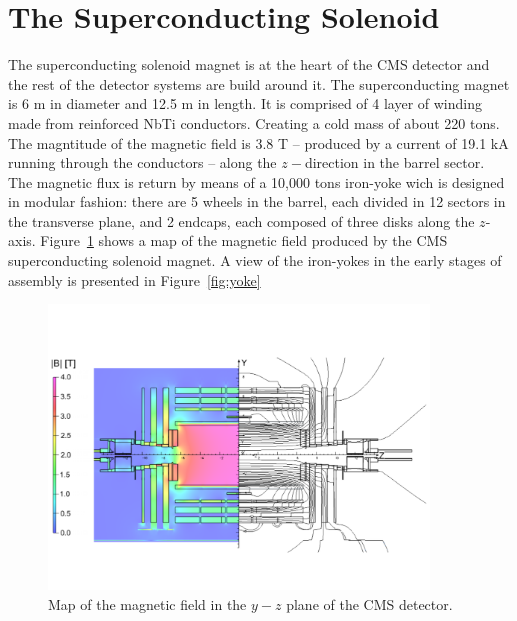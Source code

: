 \section{The Superconducting Solenoid}
The superconducting solenoid magnet is at the heart of the CMS
detector and the rest of the detector systems are build around it. The
superconducting magnet is 6 m in diameter and 12.5 m in length. It is
comprised of 4 layer of winding made from reinforced NbTi
conductors. Creating a cold mass of about 220 tons. The magntitude of
the magnetic field is 3.8 T -- produced by a  current of 19.1 kA
running through the conductors -- along the $z-$direction in the
barrel sector. The magnetic flux is return by means of a 10,000 tons
iron-yoke wich is designed in modular fashion: there are 5 wheels in
the barrel, each divided in 12 sectors in the transverse plane, and 2
endcaps, each composed of three disks along the
$z$-axis. Figure~\ref{fig:BField} shows a map of the magnetic field produced
by the CMS superconducting solenoid magnet. A view of the iron-yokes
in the early stages of assembly is presented in Figure~\ref{fig:yoke}
\begin{figure}
 \centering
\includegraphics[width=0.9\textwidth]{CMS_DetectorFigures/CMS_B_Field.pdf}
\caption{Map of the magnetic field in the $y-z$ plane of the CMS detector.\label{fig:BField}}
\end{figure}
